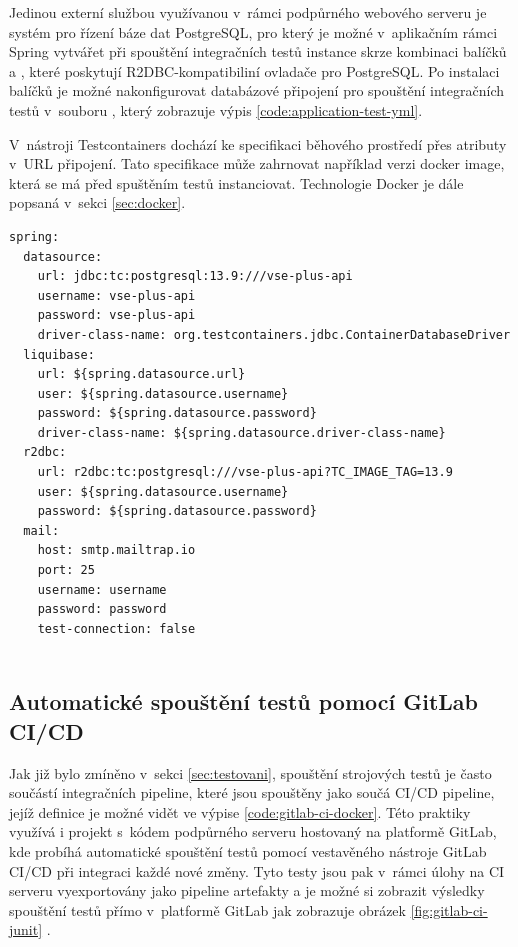 Jedinou externí službou využívanou v~rámci podpůrného webového serveru je systém pro řízení báze dat PostgreSQL, pro který je možné v~aplikačním rámci Spring vytvářet při spouštění integračních testů instance skrze kombinaci balíčků  a , které poskytují R2DBC-kompatibiliní ovladače pro PostgreSQL. Po instalaci balíčků je možné nakonfigurovat databázové připojení pro spouštění integračních testů v~souboru , který zobrazuje výpis \ref{code:application-test-yml}.

V~nástroji Testcontainers dochází ke specifikaci běhového prostředí přes atributy v~URL připojení. Tato specifikace může zahrnovat například verzi docker image, která se má před spuštěním testů instanciovat. Technologie Docker je dále popsaná v~sekci \ref{sec:docker}.

\begin{lstlisting}[label={code:application-test-yml}, caption={Konfigurace prostředí pro spouštění testů s~využitím testcontainers (vlastní zpracování)}]
spring:
  datasource:
    url: jdbc:tc:postgresql:13.9:///vse-plus-api
    username: vse-plus-api
    password: vse-plus-api
    driver-class-name: org.testcontainers.jdbc.ContainerDatabaseDriver
  liquibase:
    url: ${spring.datasource.url}
    user: ${spring.datasource.username}
    password: ${spring.datasource.password}
    driver-class-name: ${spring.datasource.driver-class-name}
  r2dbc:
    url: r2dbc:tc:postgresql:///vse-plus-api?TC_IMAGE_TAG=13.9
    user: ${spring.datasource.username}
    password: ${spring.datasource.password}
  mail:
    host: smtp.mailtrap.io
    port: 25
    username: username
    password: password
    test-connection: false
 
\end{lstlisting}

\subsection{Automatické spouštění testů pomocí GitLab CI/CD}

Jak již bylo zmíněno v~sekci \ref{sec:testovani}, spouštění strojových testů je často součástí integračních pipeline, které jsou spouštěny jako součá CI/CD pipeline, jejíž definice je možné vidět ve výpise \ref{code:gitlab-ci-docker}. Této praktiky využívá i projekt s~kódem podpůrného serveru hostovaný na platformě GitLab, kde probíhá automatické spouštění testů pomocí vestavěného nástroje GitLab CI/CD při integraci každé nové změny. Tyto testy jsou pak v~rámci úlohy na CI serveru vyexportovány jako pipeline artefakty a je možné si zobrazit výsledky spouštění testů přímo v~platformě GitLab jak zobrazuje obrázek \ref{fig:gitlab-ci-junit} \cite{gitlab_unit_test_reports}. 

